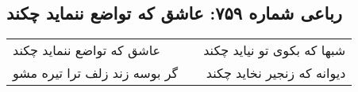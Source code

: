 \begin{center}
\section*{رباعی شماره ۷۵۹: عاشق که تواضع ننماید چکند}
\label{sec:0759}
\begin{longtable}{l p{0.5cm} r}
عاشق که تواضع ننماید چکند
&&
شبها که بکوی تو نیاید چکند
\\
گر بوسه زند زلف ترا تیره مشو
&&
دیوانه که زنجیر نخاید چکند
\\
\end{longtable}
\end{center}
